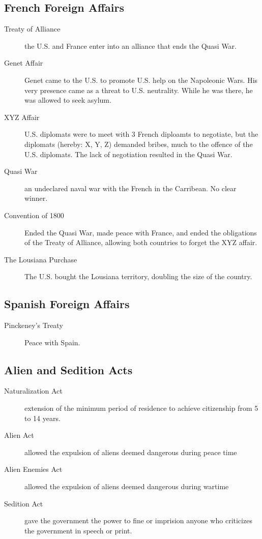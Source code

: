 \subsection{French Foreign Affairs}
\begin{description}
  \item[Treaty of Alliance] the U.S. and France enter into an alliance that ends
    the Quasi War.
  \item[Genet Affair] Genet came to the U.S. to promote U.S. help on the
    Napoleonic Wars.  His very presence came as a threat to U.S. neutrality.
    While he was there, he was allowed to seek asylum.
  \item[XYZ Affair] U.S. diplomats were to meet with 3 French diploamts to
    negotiate, but the diplomats (hereby: X, Y, Z) demanded bribes, much to the
    offence of the U.S. diplomats.  The lack of negotiation resulted in the
    Quasi War.
  \item[Quasi War] an undeclared naval war with the French in the Carribean.  No
    clear winner.
  \item[Convention of 1800] Ended the Quasi War, made peace with France, and
    ended the obligations of the Treaty of Alliance, allowing both countries to
    forget the XYZ affair.
  \item[The Lousiana Purchase] The U.S. bought the Lousiana territory, doubling
    the size of the country.
\end{description}

\subsection{Spanish Foreign Affairs}
\begin{description}
  \item[Pinckeney's Treaty] Peace with Spain.
\end{description}

\subsection{Alien and Sedition Acts}
\begin{description}
  \item[Naturalization Act] extension of the minimum period of residence to
    achieve citizenship from 5 to 14 years.
  \item[Alien Act] allowed the expulsion of aliens deemed dangerous during peace
    time
  \item[Alien Enemies Act] allowed the expulsion of aliens deemed dangerous
    during wartime
  \item[Sedition Act] gave the government the power to fine or imprision anyone
    who criticizes the government in speech or print.
\end{description}

